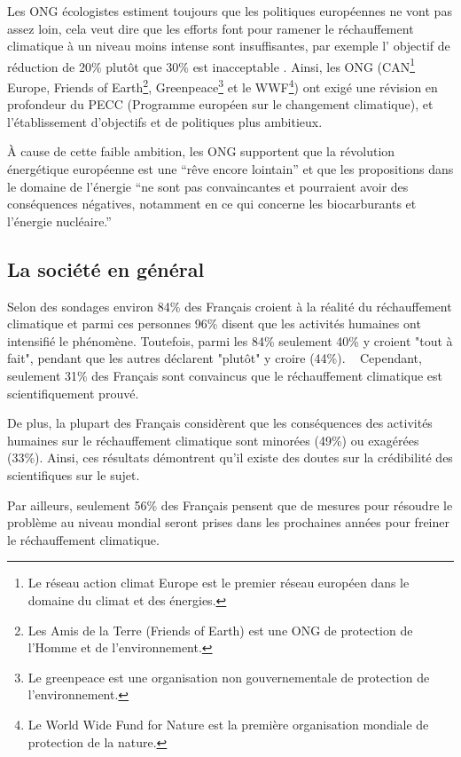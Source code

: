 \documentclass[a4paper,11pt]{article}
\begin{document}
Les ONG écologistes estiment toujours que les politiques européennes ne vont pas
assez loin,  cela veut dire que  les efforts font pour  ramener le réchauffement
climatique à un niveau moins intense sont insuffisantes, par exemple l' objectif 
de réduction de 20\% plutôt que 30\% est inacceptable .
  Ainsi, les ONG
(CAN\footnote{Le  réseau  action climat  Europe  est  le
  premier réseau européen dans le domaine du climat et des énergies.}
Europe, Friends  of Earth\footnote{Les Amis de  la Terre (Friends  of Earth) est
  une  ONG  de protection  de l'Homme  et de
  l'environnement.},
Greenpeace\footnote{ Le  greenpeace est une organisation  non gouvernementale de
  protection de l'environnement.}  et le  WWF\footnote{Le World  Wide Fund  for Nature  est  la première
  organisation mondiale de protection de  la nature.}) ont exigé une révision en
profondeur  du  PECC  (Programme  européen  sur le  changement  climatique),  et
l'établissement d'objectifs et de politiques plus ambitieux.  



À cause de cette faible ambition, les ONG supportent que la révolution énergétique
européenne est une ``rêve encore lointain'' et que les propositions
dans le domaine de l'énergie ``ne  sont pas convaincantes et pourraient avoir des
conséquences  négatives,  notamment en  ce  qui  concerne  les biocarburants  et
l'énergie nucléaire.''~\cite{ONG}


\subsection[La société en général]
{La société en général} 

Selon des sondages environ 84\% des Français croient à la réalité du réchauffement
climatique et  parmi ces  personnes  96\% disent que  les activités
humaines ont intensifié le phénomène.
Toutefois, parmi les 84\% seulement 40\% y croient "tout à fait", pendant que les autres déclarent "plutôt" y
croire (44\%). ~\cite{FR}
Cependant, seulement 31\% des Français sont convaincus que le réchauffement climatique est
scientifiquement prouvé.

De plus, la plupart des Français considèrent que les conséquences des activités humaines
sur le réchauffement climatique sont minorées (49\%) ou exagérées (33\%). 
Ainsi, ces résultats démontrent qu'il existe des doutes sur la crédibilité des scientifiques sur le
sujet. 

Par ailleurs, seulement 56\% des Français pensent que de mesures pour résoudre le
problème au niveau mondial seront prises dans  les prochaines années  pour freiner le réchauffement  climatique.
\end{document}
